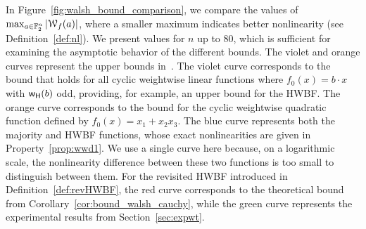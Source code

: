 \documentclass[11pt]{llncs}
\begin{document}

In Figure~\ref{fig:walsh_bound_comparison}, we compare the values of $\max_{a \in \mathbb{F}_2^n} |\mathcal W_{f}(a)|$, where a smaller maximum indicates better nonlinearity (see Definition~\ref{def:nl}). 
We present values for $n$ up to $80$, which is sufficient for examining the asymptotic behavior of the different bounds.
The violet and orange curves represent the upper bounds  in~\cite{DAM:MeaOza24}. The violet curve corresponds to the bound that holds for all cyclic weightwise linear functions where $ f_0(x) = b \cdot x $ with $\mathsf{w_H}(b)$ odd, providing, for example, an upper bound for the HWBF. The orange curve corresponds to the bound for the cyclic weightwise quadratic function defined by $f_0(x) = x_1 + x_2 x_3$.
The blue curve represents both the majority and HWBF functions, whose exact nonlinearities are given in Property~\ref{prop:wwd1}. We use a single curve here because, on a logarithmic scale, the nonlinearity difference between these two functions is too small to distinguish between them.
For the revisited HWBF introduced in Definition~\ref{def:revHWBF}, the red curve corresponds to the theoretical bound from Corollary~\ref{cor:bound_walsh_cauchy}, while the green curve represents the experimental results from Section~\ref{sec:expwt}.
\end{document}
